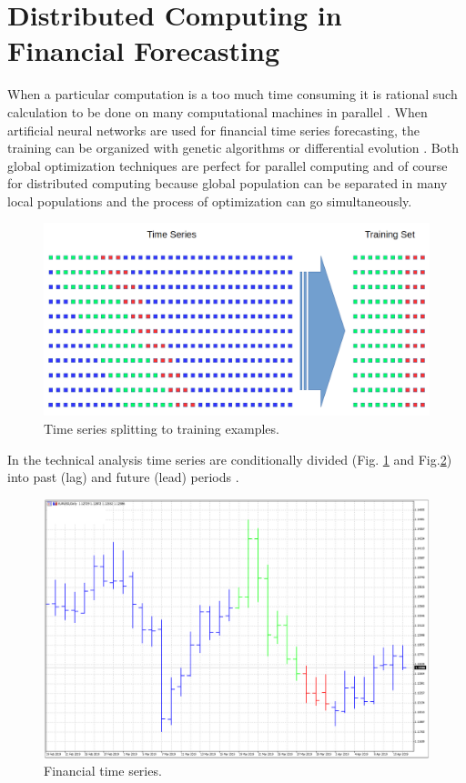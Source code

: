 \documentclass[runningheads]{llncs}
\begin{document}
\section{Distributed Computing in Financial Forecasting}
%
When a particular computation is a too much time consuming it is rational such calculation to be done on many computational machines in parallel \cite{distributed-computing-01}. When artificial neural networks are used for financial time series forecasting, the training can be organized with genetic algorithms \cite{genetic-algorithms-01} or differential evolution \cite{differential-evolution-01}. Both global optimization techniques are perfect for parallel computing and of course for distributed computing because global population can be separated in many local populations and the process of optimization can go simultaneously.

\begin{figure}
\includegraphics[width=\textwidth]{fig01.png}
\caption{Time series splitting to training examples.}
\label{fig01}
\end{figure}

In the technical analysis time series are conditionally divided (Fig. \ref{fig01} and Fig.\ref{fig02}) into past (lag) and future (lead) periods \cite{time-series-04}.

\begin{figure}
\includegraphics[width=\textwidth]{fig02.png}
\caption{Financial time series.}
\label{fig02}
\end{figure}
%
\end{document}
